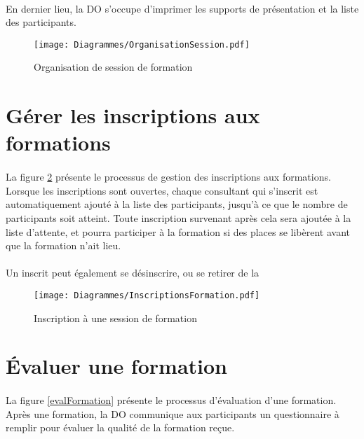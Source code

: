 \paragraph{} En dernier lieu, la DO s'occupe d'imprimer les supports de présentation et la liste des participants.
\begin{figure}[H]
	\centering
\begin{sideways}
	\texttt{[image: Diagrammes/OrganisationSession.pdf]}
\end{sideways}
	\caption{Organisation de session de formation} 
	\label{orgaForm}
\end{figure}




\section{Gérer les inscriptions aux formations}
\label{sec:inscriptions}
\paragraph{} La figure \ref{inscriptionForm} présente le processus de gestion des inscriptions aux formations. Lorsque les inscriptions sont ouvertes, chaque consultant qui s'inscrit est automatiquement ajouté à la liste des participants, jusqu'à ce que le nombre de participants soit atteint. Toute inscription survenant après cela sera ajoutée à la liste d'attente, et pourra participer à la formation si des places se libèrent avant que la formation n'ait lieu.
\paragraph{} Un inscrit peut également se désinscrire, ou se retirer de la 


\begin{figure}[H]
\centering
\begin{sideways}
	\texttt{[image: Diagrammes/InscriptionsFormation.pdf]}
\end{sideways}
	\caption{Inscription à une session de formation}
	\label{inscriptionForm}
\end{figure}


\section{Évaluer une formation}
\label{sec:eval}
\paragraph{} La figure \ref{evalFormation} présente le processus d'évaluation d'une formation. Après une formation, la DO communique aux participants un questionnaire à remplir pour évaluer la qualité de la formation reçue.
